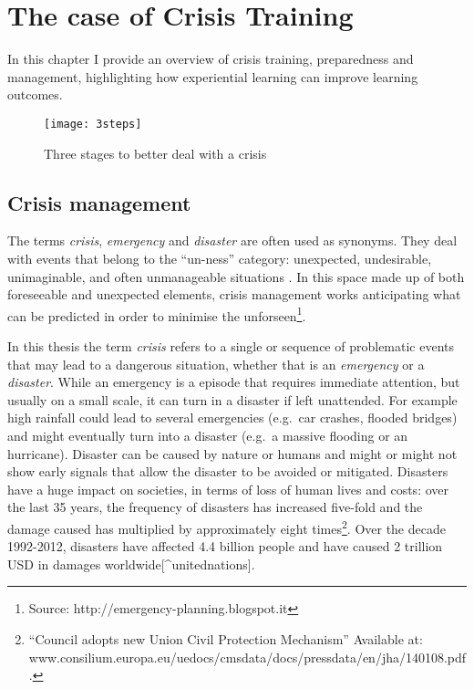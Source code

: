 \chapter{The case of Crisis Training}\label{crisis}


In this chapter I provide an overview of crisis training, preparedness and management, highlighting how experiential learning can improve learning outcomes.
\begin{figure}
	[h!] \centering 
	\texttt{[image: 3steps]} \caption{Three stages to better deal with a crisis} \label{fig:three-stages} 
\end{figure}


\section{Crisis management}\label{crisis-management}

The terms \emph{crisis}, \emph{emergency} and \emph{disaster} are often used as synonyms. They deal with events that belong to the ``un-ness'' category: unexpected, undesirable, unimaginable, and often unmanageable situations \autocites{Boin:2007wt}{hewit}. In this space made up of both foreseeable and unexpected elements, crisis management works anticipating what can be predicted in order to minimise the unforseen\footnote{Source: http://emergency-planning.blogspot.it}.

In this thesis the term \emph{crisis} refers to a single or sequence of problematic events that may lead to a dangerous situation, whether that is an \emph{emergency} or a \emph{disaster}. While an emergency is a episode that requires immediate attention, but usually on a small scale, it can turn in a disaster if left unattended. For example high rainfall could lead to several emergencies (e.g.~car crashes, flooded bridges) and might eventually turn into a disaster (e.g.~a massive flooding or an hurricane). Disaster can be caused by nature or humans and might or might not show early signals that allow the disaster to be avoided or mitigated. Disasters have a huge impact on societies, in terms of loss of human lives and costs: over the last 35 years, the frequency of disasters has increased five-fold and the damage caused has multiplied by approximately eight times\footnote{``Council adopts new Union Civil Protection Mechanism'' Available at: www.consilium.europa.eu/uedocs/cmsdata/docs/pressdata/en/jha/140108.pdf.}. Over the decade 1992-2012, disasters have affected 4.4 billion people and have caused 2 trillion USD in damages worldwide{[}\^{}unitednations{]}.

